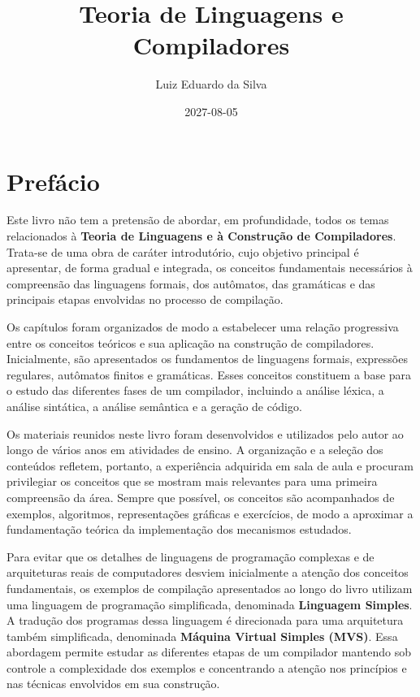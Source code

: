 \documentclass[
  brazilian,
  letterpaper,
]{book}
\title{Teoria de Linguagens e Compiladores}
\author{Luiz Eduardo da Silva}
\date{2027-08-05}
\renewcommand*\contentsname{Índice}
\newcommand\contentsname{Índice}
\theoremstyle{plain}
\theoremstyle{definition}
\theoremstyle{remark}
\begin{document}
\frontmatter
\maketitle

\renewcommand*\contentsname{Índice}
{
\setcounter{tocdepth}{2}
\tableofcontents
}

\mainmatter
{}

\chapter*{Prefácio}\label{prefuxe1cio}


Este livro não tem a pretensão de abordar, em profundidade, todos os
temas relacionados à \textbf{Teoria de Linguagens e à Construção de
Compiladores}. Trata-se de uma obra de caráter introdutório, cujo
objetivo principal é apresentar, de forma gradual e integrada, os
conceitos fundamentais necessários à compreensão das linguagens formais,
dos autômatos, das gramáticas e das principais etapas envolvidas no
processo de compilação.

Os capítulos foram organizados de modo a estabelecer uma relação
progressiva entre os conceitos teóricos e sua aplicação na construção de
compiladores. Inicialmente, são apresentados os fundamentos de
linguagens formais, expressões regulares, autômatos finitos e
gramáticas. Esses conceitos constituem a base para o estudo das
diferentes fases de um compilador, incluindo a análise léxica, a análise
sintática, a análise semântica e a geração de código.

Os materiais reunidos neste livro foram desenvolvidos e utilizados pelo
autor ao longo de vários anos em atividades de ensino. A organização e a
seleção dos conteúdos refletem, portanto, a experiência adquirida em
sala de aula e procuram privilegiar os conceitos que se mostram mais
relevantes para uma primeira compreensão da área. Sempre que possível,
os conceitos são acompanhados de exemplos, algoritmos, representações
gráficas e exercícios, de modo a aproximar a fundamentação teórica da
implementação dos mecanismos estudados.

Para evitar que os detalhes de linguagens de programação complexas e de
arquiteturas reais de computadores desviem inicialmente a atenção dos
conceitos fundamentais, os exemplos de compilação apresentados ao longo
do livro utilizam uma linguagem de programação simplificada, denominada
\textbf{Linguagem Simples}. A tradução dos programas dessa linguagem é
direcionada para uma arquitetura também simplificada, denominada
\textbf{Máquina Virtual Simples (MVS)}. Essa abordagem permite estudar
as diferentes etapas de um compilador mantendo sob controle a
complexidade dos exemplos e concentrando a atenção nos princípios e nas
técnicas envolvidos em sua construção.
\end{document}
